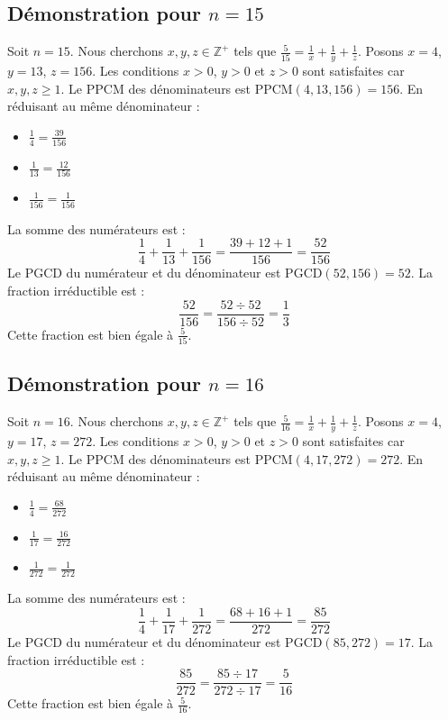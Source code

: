 \documentclass[11pt,a4paper]{article}
\begin{document}
\subsection{Démonstration pour $n = 15$}
Soit $n = 15$. Nous cherchons $x, y, z \in \mathbb{Z}^{+}$ tels que $\frac{5}{15} = \frac{1}{x} + \frac{1}{y} + \frac{1}{z}$.
Posons $x = 4$, $y = 13$, $z = 156$.
Les conditions $x > 0$, $y > 0$ et $z > 0$ sont satisfaites car $x, y, z \geq 1$.
Le PPCM des dénominateurs est $\text{PPCM}(4, 13, 156) = 156$.
En réduisant au même dénominateur :
\begin{itemize}
    \item $\frac{1}{4} = \frac{39}{156}$
    \item $\frac{1}{13} = \frac{12}{156}$
    \item $\frac{1}{156} = \frac{1}{156}$
\end{itemize}
La somme des numérateurs est :
$$ \frac{1}{4} + \frac{1}{13} + \frac{1}{156} = \frac{39 + 12 + 1}{156} = \frac{52}{156} $$
Le PGCD du numérateur et du dénominateur est $\text{PGCD}(52, 156) = 52$.
La fraction irréductible est :
$$ \frac{52}{156} = \frac{52 \div 52}{156 \div 52} = \frac{1}{3} $$
Cette fraction est bien égale à $\frac{5}{15}$.

\subsection{Démonstration pour $n = 16$}
Soit $n = 16$. Nous cherchons $x, y, z \in \mathbb{Z}^{+}$ tels que $\frac{5}{16} = \frac{1}{x} + \frac{1}{y} + \frac{1}{z}$.
Posons $x = 4$, $y = 17$, $z = 272$.
Les conditions $x > 0$, $y > 0$ et $z > 0$ sont satisfaites car $x, y, z \geq 1$.
Le PPCM des dénominateurs est $\text{PPCM}(4, 17, 272) = 272$.
En réduisant au même dénominateur :
\begin{itemize}
    \item $\frac{1}{4} = \frac{68}{272}$
    \item $\frac{1}{17} = \frac{16}{272}$
    \item $\frac{1}{272} = \frac{1}{272}$
\end{itemize}
La somme des numérateurs est :
$$ \frac{1}{4} + \frac{1}{17} + \frac{1}{272} = \frac{68 + 16 + 1}{272} = \frac{85}{272} $$
Le PGCD du numérateur et du dénominateur est $\text{PGCD}(85, 272) = 17$.
La fraction irréductible est :
$$ \frac{85}{272} = \frac{85 \div 17}{272 \div 17} = \frac{5}{16} $$
Cette fraction est bien égale à $\frac{5}{16}$.
\end{document}

